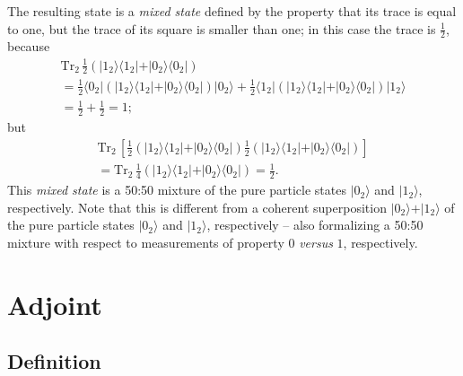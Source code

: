{The resulting state is a
{\em mixed state}
defined by the property that its trace is equal to one,
but the trace of its square is smaller than one; in this case the trace is $\frac{1}{2}$, because
\begin{equation}
\begin{split}
\textrm{Tr}_2\,
\frac{1}{2}
\left(
\vert 1_2 \rangle \langle   1_2 \vert
+
\vert 0_2 \rangle \langle   0_2 \vert
\right) \\
= \frac{1}{2}  \langle 0_2 \vert
\left(
\vert 1_2 \rangle \langle   1_2 \vert
+
\vert 0_2 \rangle \langle   0_2 \vert
\right)
\vert 0_2 \rangle
+  \frac{1}{2}
\langle 1_2  \vert
\left(
\vert 1_2 \rangle \langle   1_2 \vert
+
\vert 0_2 \rangle \langle   0_2 \vert
\right)
\vert 1_2 \rangle  \\
=  \frac{1}{2} + \frac{1}{2} =1;
\end{split}
\end{equation}
but
\begin{equation}
\begin{split}
\textrm{Tr}_2\,
\left[
\frac{1}{2}
\left(
\vert 1_2 \rangle \langle   1_2 \vert
+
\vert 0_2 \rangle \langle   0_2 \vert
\right)
\frac{1}{2}
\left(
\vert 1_2 \rangle \langle   1_2 \vert
+
\vert 0_2 \rangle \langle   0_2 \vert
\right)
\right]
\\ =
\textrm{Tr}_2\,
\frac{1}{4}
\left(
\vert 1_2 \rangle \langle   1_2 \vert
+
\vert 0_2 \rangle \langle   0_2 \vert
\right)
= \frac{1}{2}.
\end{split}
\end{equation}
This {\em mixed state} is a 50:50 mixture of the pure particle states  $\vert 0_2 \rangle$ and $\vert 1_2 \rangle$, respectively.
Note that this is different from
a coherent superposition
$\vert 0_2 \rangle + \vert 1_2 \rangle$
 of the pure particle states  $\vert 0_2 \rangle$ and $\vert 1_2 \rangle$, respectively --
also formalizing a 50:50 mixture with respect to measurements of property $0$ {\it versus} $1$, respectively.

\eexample
}

\section{Adjoint}
\label{2014-m-fdvs-adjoint}

\subsection{Definition}

